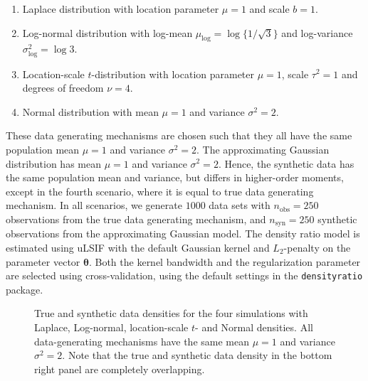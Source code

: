 \documentclass[
]{article}
\providecommand{\tightlist}{%
  \setlength{\itemsep}{0pt}\setlength{\parskip}{0pt}}
\newcommand{\nobs}{n_{\text{obs}}}
\newcommand{\nsyn}{n_{\text{syn}}}
\begin{document}
\begin{enumerate}
\def\labelenumi{\arabic{enumi}.}
\tightlist
\item
  Laplace distribution with location parameter \(\mu = 1\) and scale
  \(b = 1\).
\item
  Log-normal distribution with log-mean
  \(\mu_{\text{log}} = \log \{1/\sqrt{3} \}\) and log-variance
  \(\sigma^2_\text{log} = \log 3\).
\item
  Location-scale \(t\)-distribution with location parameter \(\mu = 1\),
  scale \(\tau^2 = 1\) and degrees of freedom \(\nu = 4\).
\item
  Normal distribution with mean \(\mu = 1\) and variance
  \(\sigma^2 = 2\).
\end{enumerate}

These data generating mechanisms are chosen such that they all have the
same population mean \(\mu = 1\) and variance \(\sigma^2 = 2\). The
approximating Gaussian distribution has mean \(\mu = 1\) and variance
\(\sigma^2 = 2\). Hence, the synthetic data has the same population mean
and variance, but differs in higher-order moments, except in the fourth
scenario, where it is equal to true data generating mechanism. In all
scenarios, we generate \(1000\) data sets with \(\nobs = 250\)
observations from the true data generating mechanism, and
\(\nsyn = 250\) synthetic observations from the approximating Gaussian
model. The density ratio model is estimated using uLSIF with the default
Gaussian kernel and \(L_2\)-penalty on the parameter vector
\(\boldsymbol{\theta}\). Both the kernel bandwidth and the
regularization parameter are selected using cross-validation, using the
default settings in the \texttt{densityratio} package.

\linespread{1}

\begin{figure}[t]


\caption{\label{fig-densities-sim1}True and synthetic data densities for
the four simulations with Laplace, Log-normal, location-scale \(t\)- and
Normal densities. All data-generating mechanisms have the same mean
\(\mu = 1\) and variance \(\sigma^2 = 2\). Note that the true and
synthetic data density in the bottom right panel are completely
overlapping.}

\end{figure}%
\end{document}
